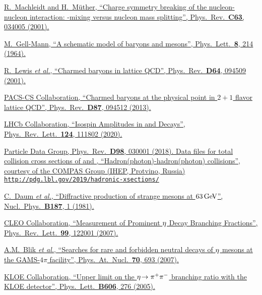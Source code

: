 {\begin{thebibliography}{xxx}
	\href{https://doi.org/10.1103/PhysRevC.63.034005}{R.~Machleidt and H.~Müther, \enquote{Charge symmetry breaking of the nucleon-nucleon interaction: \Prho-\Pomega mixing versus nucleon mass splitting}, Phys.\ Rev.\ \textbf{C63}, 034005 (2001).}

	\href{https://doi.org/10.1016/S0031-9163(64)92001-3}{M.~Gell-Mann, \enquote{A schematic model of baryons and mesons}, Phys.\ Lett.\ \textbf{8}, 214 (1964).}

	\href{https://doi.org/10.1103/PhysRevD.64.094509}{R.~Lewis \textit{et al.}, \enquote{Charmed baryons in lattice QCD}, Phys.\ Rev.\ \textbf{D64}, 094509 (2001).}

	\href{https://doi.org/10.1103/PhysRevD.87.094512}{PACS-CS Collaboration, \enquote{Charmed baryons at the physical point in $2+1$ flavor lattice QCD}, Phys.\ Rev.\ \textbf{D87}, 094512 (2013).}

	\href{https://doi.org/10.1103/PhysRevLett.124.111802}{LHCb Collaboration, \enquote{Isospin Amplitudes in  and \decay{\Xibz}{\jpsi/\Xiz(\Lz)} Decays}, Phys.\ Rev.\ Lett.\ \textbf{124}, 111802 (2020).}

	\href{http://pdg.lbl.gov/2019/hadronic-xsections/}{Particle Data Group, Phys.\ Rev.\ \textbf{D98}, 030001 (2018). Data files for total collision cross sections of \proton \pim and \proton \pip, \enquote{Hadron(photon)-hadron(photon) collisions}, courtesy of the COMPAS Group (IHEP, Protvino, Russia)\\ \texttt{http://pdg.lbl.gov/2019/hadronic-xsections/}}

	\href{https://doi.org/10.1016/0550-3213(81)90114-0}{C.~Daum \textit{et al.}, \enquote{Diffractive production of strange mesons at $63\mathrm{\,Ge\kern -0.1em V}$}, Nucl.\ Phys.\ \textbf{B187}, 1 (1981).}

	\href{https://doi.org/10.1103/PhysRevLett.99.122001}{CLEO Collaboration, \enquote{Measurement of Prominent $\eta$ Decay Branching Fractions}, Phys.\ Rev.\ Lett.\ \textbf{99}, 122001 (2007).}

	\href{https://doi.org/10.1134/S1063778807040102}{A.M.~Blik \textit{et al.}, \enquote{Searches for rare and forbidden neutral decays of $\eta$ mesons at the GAMS-$4\pi$ facility}, Phys.\ At.\ Nucl.\ \textbf{70}, 693 (2007).}

	\href{https://doi.org/10.1016/j.physletb.2004.12.025}{KLOE Collaboration, \enquote{Upper limit on the $\eta\!\rightarrow {\ensuremath{{\pi}^+}}{\ensuremath{{\pi}^-}}$ branching ratio with the KLOE detector}, Phys.\ Lett.\ \textbf{B606}, 276 (2005).}


\end{thebibliography}}
